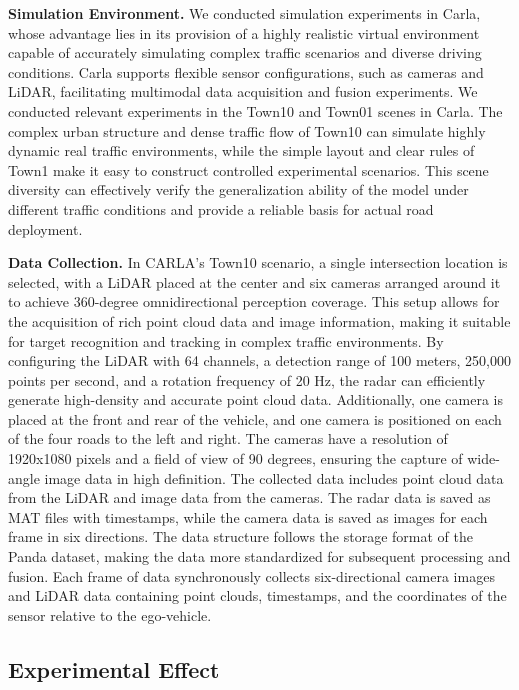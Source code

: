 \documentclass[lettersize,journal]{IEEEtran}
\begin{document}
\textbf{Simulation Environment.}
We conducted simulation experiments in Carla, whose advantage lies in its provision of a highly realistic virtual environment capable of accurately simulating complex traffic scenarios and diverse driving conditions. 
Carla supports flexible sensor configurations, such as cameras and LiDAR, facilitating multimodal data acquisition and fusion experiments\cite{Alpher22e}. 
We conducted relevant experiments in the Town10 and Town01 scenes in Carla.
The complex urban structure and dense traffic flow of Town10 can simulate highly dynamic real traffic environments, while the simple layout and clear rules of Town1 make it easy to construct controlled experimental scenarios.
This scene diversity can effectively verify the generalization ability of the model under different traffic conditions and provide a reliable basis for actual road deployment.

\textbf{Data Collection.}
In CARLA's Town10 scenario, a single intersection location is selected, with a LiDAR placed at the center and six cameras arranged around it to achieve 360-degree omnidirectional perception coverage. 
This setup allows for the acquisition of rich point cloud data and image information, making it suitable for target recognition and tracking in complex traffic environments. 
By configuring the LiDAR with 64 channels, a detection range of 100 meters, 250,000 points per second, and a rotation frequency of 20 Hz, the radar can efficiently generate high-density and accurate point cloud data. 
Additionally, one camera is placed at the front and rear of the vehicle, and one camera is positioned on each of the four roads to the left and right. 
The cameras have a resolution of 1920x1080 pixels and a field of view of 90 degrees, ensuring the capture of wide-angle image data in high definition. 
The collected data includes point cloud data from the LiDAR and image data from the cameras. 
The radar data is saved as MAT files with timestamps, while the camera data is saved as images for each frame in six directions. 
The data structure follows the storage format of the Panda dataset, making the data more standardized for subsequent processing and fusion\cite{Alpher21c}. 
Each frame of data synchronously collects six-directional camera images and LiDAR data containing point clouds, timestamps, and the coordinates of the sensor relative to the ego-vehicle.

\subsection{Experimental Effect}
\end{document}
